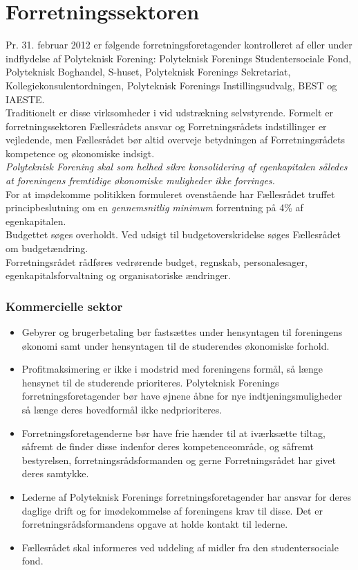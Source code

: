 \section{Forretningssektoren}
Pr. 31. februar 2012 er følgende forretningsforetagender kontrolleret af eller under indflydelse af Polyteknisk Forening: Polyteknisk Forenings Studentersociale Fond, Polyteknisk Boghandel, S-huset, Polyteknisk Forenings Sekretariat, Kollegiekonsulentordningen, Polyteknisk Forenings Instillingsudvalg, BEST og IAESTE.\\

Traditionelt er disse virksomheder i vid udstrækning selvstyrende. Formelt er forretningssektoren Fællesrådets ansvar og Forretningsrådets indstillinger er vejledende, men Fællesrådet bør altid overveje betydningen af Forretningsrådets kompetence og økonomiske indsigt.\\

\textit{Polyteknisk Forening skal som helhed sikre konsolidering af egenkapitalen således at foreningens fremtidige økonomiske muligheder ikke forringes.}\\

For at imødekomme politikken formuleret ovenstående har Fællesrådet truffet principbeslutning om en \textit{gennemsnitlig minimum} forrentning på 4\% af egenkapitalen.\\

Budgettet søges overholdt. Ved udsigt til budgetoverskridelse søges Fællesrådet om budgetændring.\\

Forretningsrådet rådføres vedrørende budget, regnskab, personalesager, egenkapitalsforvaltning og organisatoriske
ændringer.

\subsubsection{Kommercielle sektor}
\begin{itemize}
\item Gebyrer og brugerbetaling bør fastsættes under hensyntagen til foreningens økonomi samt under hensyntagen til de studerendes økonomiske forhold.
\item Profitmaksimering er ikke i modstrid med foreningens formål, så længe hensynet til de studerende prioriteres. Polyteknisk Forenings forretningsforetagender bør have øjnene åbne for nye indtjeningsmuligheder så længe deres hovedformål ikke nedprioriteres.
\item Forretningsforetagenderne bør have frie hænder til at iværksætte tiltag, såfremt de finder disse indenfor deres kompetenceområde, og såfremt bestyrelsen, forretningsrådsformanden og gerne Forretningsrådet har givet deres samtykke.
\item Lederne af Polyteknisk Forenings forretningsforetagender har ansvar for deres daglige drift og for imødekommelse af foreningens krav til disse. Det er forretningsrådsformandens opgave at holde kontakt til lederne.
\item Fællesrådet skal informeres ved uddeling af midler fra den studentersociale fond.
\end{itemize}

